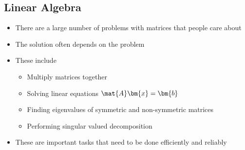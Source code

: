 \begin{slide}
\section[-2]{Linear Algebra}

\begin{PauseHighLight}
  \begin{itemize}
  \item There are a large number of problems with matrices that people
    care about\pause
  \item The solution often depends on the problem\pause
  \item These include
    \begin{itemize}\squeeze
    \item Multiply matrices together
    \item Solving linear equations $\mat{A} \bm{x} = \bm{b}$
    \item Finding eigenvalues of symmetric and non-symmetric matrices
    \item Performing singular valued decomposition\pause
    \end{itemize}
  \item These are important tasks that need to be done efficiently and
    reliably\pause
  \end{itemize}
\end{PauseHighLight}

\end{slide}


